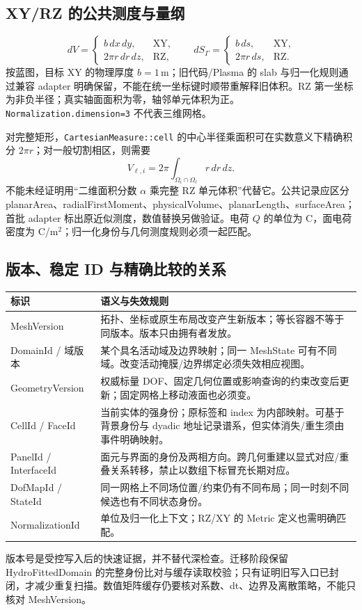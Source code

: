\documentclass[UTF8,a4paper,11pt,fontset=fandol]{ctexart}
\newcommand{\code}[1]{\nolinkurl{#1}}
\begin{document}
\subsection{XY/RZ 的公共测度与量纲}
\[
 dV=\begin{cases}b\,dx\,dy,&\text{XY},\\2\pi r\,dr\,dz,&\text{RZ},\end{cases}
 \qquad
 dS_\Gamma=\begin{cases}b\,ds,&\text{XY},\\2\pi r\,ds,&\text{RZ}.\end{cases}
\]
按蓝图，目标 XY 的物理厚度 $b=1\,\mathrm m$；旧代码/Plasma 的 slab 与归一化规则通过兼容 adapter 明确保留，不能在统一坐标键时顺带重解释旧体积。RZ 第一坐标为非负半径；真实轴面面积为零，轴邻单元体积为正。\code{Normalization.dimension=3} 不代表三维网格。

对完整矩形，\code{CartesianMeasure::cell} 的中心半径乘面积可在实数意义下精确积分 $2\pi r$；对一般切割相区，则需要
\[
 V_{\ell,i}=2\pi\int_{\Omega_i\cap\Omega_\ell}r\,dr\,dz.
\]
不能未经证明用“二维面积分数 $\alpha$ 乘完整 RZ 单元体积”代替它。公共记录应区分 planarArea、radialFirstMoment、physicalVolume、planarLength、surfaceArea；首批 adapter 标出原近似测度，数值替换另做验证。电荷 $Q$ 的单位为 C，面电荷密度为 C/m$^2$；归一化身份与几何测度规则必须一起匹配。

\subsection{版本、稳定 ID 与精确比较的关系}
\begin{longtable}{@{}P{.24\textwidth}P{.7\textwidth}@{}}
\toprule 标识 & 语义与失效规则\\\midrule\endhead
MeshVersion & 拓扑、坐标或原生布局改变产生新版本；等长容器不等于同版本。版本只由拥有者发放。\\
DomainId / 域版本 & 某个具名活动域及边界映射；同一 MeshState 可有不同域。改变活动掩膜/边界绑定必须失效相应视图。\\
GeometryVersion & 权威标量 DOF、固定几何位置或影响查询的约束改变后更新；固定网格上移动液面也必须变。\\
CellId / FaceId & 当前实体的强身份；原标签和 index 为内部映射。可基于背景身份与 dyadic 地址记录谱系，但实体消失/重生须由事件明确映射。\\
PanelId / InterfaceId & 面元与界面的身份及两相方向。跨几何重建以显式对应/重叠关系转移，禁止以数组下标冒充长期对应。\\
DofMapId / StateId & 同一网格上不同场位置/约束仍有不同布局；同一时刻不同候选也有不同状态身份。\\
NormalizationId & 单位及归一化上下文；RZ/XY 的 Metric 定义也需明确匹配。\\
\bottomrule
\end{longtable}
版本号是受控写入后的快速证据，并不替代深检查。迁移阶段保留 HydroFittedDomain 的完整身份比对与缓存读取校验；只有证明旧写入口已封闭，才减少重复扫描。数值矩阵缓存仍要核对系数、dt、边界及离散策略，不能只核对 MeshVersion。
\end{document}
